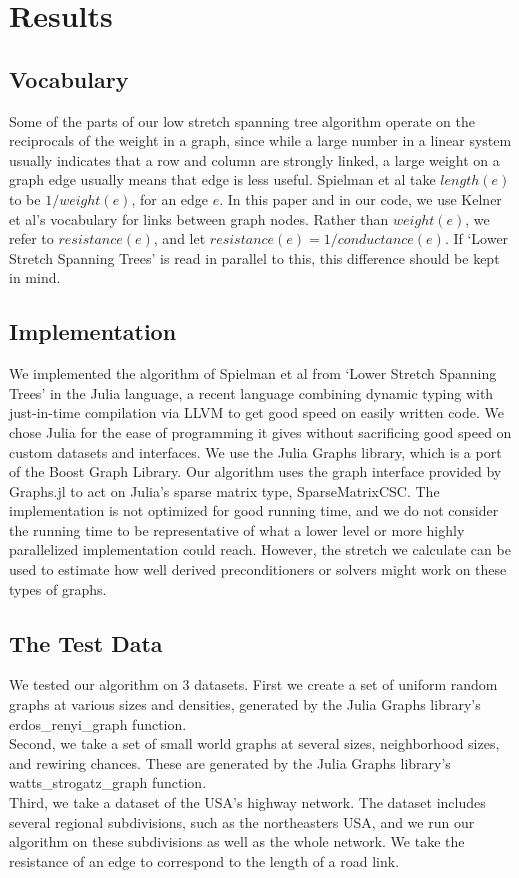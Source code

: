 \documentclass{article}
\begin{document}
\section*{Results}
\subsection*{Vocabulary}
Some of the parts of our low stretch spanning tree algorithm operate on the reciprocals of the weight in a graph, since while a large number in a linear system usually indicates that a row and column are strongly linked, a large weight on a graph edge usually means that edge is less useful.  Spielman et al take $length(e)$ to be $1/weight(e)$, for an edge $e$.  In this paper and in our code, we use Kelner et al's vocabulary for links between graph nodes.  Rather than $weight(e)$, we refer to $resistance(e)$, and let $resistance(e)=1/conductance(e)$.  If `Lower Stretch Spanning Trees' is read in parallel to this, this difference should be kept in mind.  
\subsection{Implementation}
We implemented the algorithm of Spielman et al from `Lower Stretch Spanning Trees' in the Julia language\cite{juliawebsite}, a recent language combining dynamic typing with just-in-time compilation via LLVM to get good speed on easily written code.  We chose Julia for the ease of programming it gives without sacrificing good speed on custom datasets and interfaces.  We use the Julia Graphs library\cite{juliagraphs}, which is a port of the Boost Graph Library.  Our algorithm uses the graph interface provided by Graphs.jl to act on Julia's sparse matrix type, SparseMatrixCSC.  The implementation is not optimized for good running time, and we do not consider the running time to be representative of what a lower level or more highly parallelized implementation could reach.  However, the stretch we calculate can be used to estimate how well derived preconditioners or solvers might work on these types of graphs.\\
\subsection*{The Test Data}
We tested our algorithm on 3 datasets.  First we create a set of uniform random graphs at various sizes and densities, generated by the Julia Graphs library's erdos\_renyi\_graph function.\\
Second, we take a set of small world graphs at several sizes, neighborhood sizes, and rewiring chances.  These are generated by the Julia Graphs library's watts\_strogatz\_graph function.\\
Third, we take a dataset of the USA's highway network.  The dataset includes several regional subdivisions, such as the northeasters USA, and we run our algorithm on these subdivisions as well as the whole network.  We take the resistance of an edge to correspond to the length of a road link. \\
\end{document}
